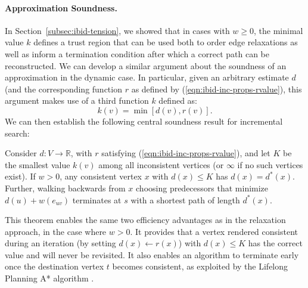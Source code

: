 
\paragraph{Approximation Soundness.}
In Section~\ref{subsec:ibid-tension},
we showed that in cases with $w \geq 0$,
the minimal value $k$ defines a trust region that can be used both
to order edge relaxations as well as inform a termination condition
after which a correct path can be reconstructed.
We can develop a similar argument about the soundness of an
approximation in the dynamic case.
In particular,
given an arbitrary estimate $d$
(and the corresponding function $r$ as defined by
(\ref{eqn:ibid-inc-props-rvalue}),
this argument makes use of a third function $k$ defined as:
\begin{equation}
   k(v) = \min\left[ d(v), r(v) \right].
   \label{eqn:ibid:incremental-key}
\end{equation}
We can then establish the following central soundness result
for incremental search:

\begin{theorem}
Consider $d: V \rightarrow \mathbb{R}$,
with $r$ satisfying (\ref{eqn:ibid-inc-props-rvalue}),
and let $K$ be the smallest value $k(v)$
among all inconsistent vertices
(or $\infty$ if no such vertices exist).
If $w > 0$,
any consistent vertex $x$ with $d(x) \leq K$
has $d(x) = d^*(x)$.
Further,
walking backwards from $x$ choosing predecessors that minimize
$d(u) + w(e_{uv})$ terminates at $s$ with a shortest path
of length $d^*(x)$.
\label{thm:ibid-dynamicswsffp-sound}
\end{theorem}

This theorem enables the same two efficiency advantages as in
the relaxation approach, in the case where $w > 0$.
It provides that a vertex rendered consistent during an iteration
(by setting $d(x) \leftarrow r(x)$) with $d(x) \leq K$
has the correct value and will never be revisited.
It also enables an algorithm to terminate early
once the destination vertex $t$ becomes consistent,
as exploited by the Lifelong Planning A* algorithm
\citep{koenig2004lpastar}.

